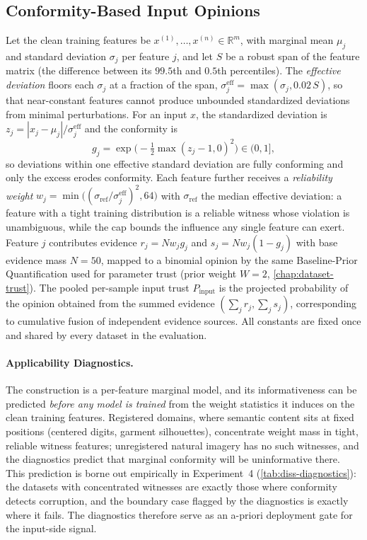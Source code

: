 \subsection{Conformity-Based Input Opinions}
\label{sec:conformity}
Let the clean training features be $x^{(1)},\dots,x^{(n)} \in \mathbb{R}^m$, with marginal mean $\mu_j$ and standard deviation $\sigma_j$ per feature $j$, and let $S$ be a robust span of the feature matrix (the difference between its $99.5$th and $0.5$th percentiles). The \emph{effective deviation} floors each $\sigma_j$ at a fraction of the span, $\sigma^{\mathrm{eff}}_j = \max(\sigma_j, 0.02\, S)$, so that near-constant features cannot produce unbounded standardized deviations from minimal perturbations. For an input $x$, the standardized deviation is $z_j = |x_j - \mu_j| / \sigma^{\mathrm{eff}}_j$ and the conformity is
\[
g_j = \exp\!\big(-\tfrac{1}{2}\max(z_j - 1, 0)^2\big) \in (0,1],
\]
so deviations within one effective standard deviation are fully conforming and only the excess erodes conformity. Each feature further receives a \emph{reliability weight} $w_j = \min\big((\sigma_{\mathrm{ref}} / \sigma^{\mathrm{eff}}_j)^2, 64\big)$ with $\sigma_{\mathrm{ref}}$ the median effective deviation: a feature with a tight training distribution is a reliable witness whose violation is unambiguous, while the cap bounds the influence any single feature can exert. Feature $j$ contributes evidence $r_j = N w_j g_j$ and $s_j = N w_j (1-g_j)$ with base evidence mass $N = 50$, mapped to a binomial opinion by the same Baseline-Prior Quantification used for parameter trust (prior weight $W = 2$, \cref{chap:dataset-trust}). The pooled per-sample input trust $P_{\mathrm{input}}$ is the projected probability of the opinion obtained from the summed evidence $(\sum_j r_j, \sum_j s_j)$, corresponding to cumulative fusion of independent evidence sources. All constants are fixed once and shared by every dataset in the evaluation.

\paragraph*{Applicability Diagnostics.}
The construction is a per-feature marginal model, and its informativeness can be predicted \emph{before any model is trained} from the weight statistics it induces on the clean training features. Registered domains, where semantic content sits at fixed positions (centered digits, garment silhouettes), concentrate weight mass in tight, reliable witness features; unregistered natural imagery has no such witnesses, and the diagnostics predict that marginal conformity will be uninformative there. This prediction is borne out empirically in Experiment~4 (\cref{tab:diss-diagnostics}): the datasets with concentrated witnesses are exactly those where conformity detects corruption, and the boundary case flagged by the diagnostics is exactly where it fails. The diagnostics therefore serve as an a-priori deployment gate for the input-side signal.

